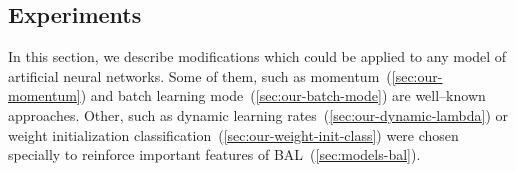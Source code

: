 \subsection{Experiments}
\label{sec:sim-exp} 

In this section, we describe modifications which could be applied to any model of artificial neural networks. Some of them, such as momentum~(\ref{sec:our-momentum}) and batch learning mode~(\ref{sec:our-batch-mode}) are well--known approaches. Other, such as dynamic learning rates~(\ref{sec:our-dynamic-lambda}) or weight initialization classification~(\ref{sec:our-weight-init-class}) were chosen specially to reinforce important features of BAL~(\ref{sec:models-bal}). 

 

 

 

 


